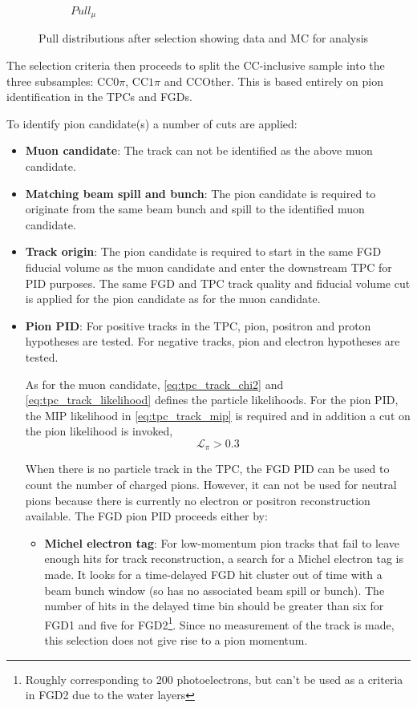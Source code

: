 \begin{figure}[h]
\begin{subfigure}[t]{0.32\textwidth}
		\caption{$Pull_\mu$}
	\end{subfigure}
	\caption{Pull distributions after selection showing data and MC for \numu analysis}
	\label{fig:numu_pulls}
\end{figure}

The selection criteria then proceeds to split the CC-inclusive sample into the three subsamples: CC$0\pi$, CC$1\pi$ and CCOther. This is based entirely on pion identification in the TPCs and FGDs.

To identify pion candidate(s) a number of cuts are applied:
\begin{itemize}
	\item \textbf{Muon candidate}: The track can not be identified as the above muon candidate.
	
	\item \textbf{Matching beam spill and bunch}: The pion candidate is required to originate from the same beam bunch and spill to the identified muon candidate.
	
	\item \textbf{Track origin}: The pion candidate is required to start in the same FGD fiducial volume as the muon candidate and enter the downstream TPC for PID purposes. The same FGD and TPC track quality and fiducial volume cut is applied for the pion candidate as for the muon candidate.
	
	\item \textbf{Pion PID}: For positive tracks in the TPC, pion, positron and proton hypotheses are tested. For negative tracks, pion and electron hypotheses are tested. 
	
	As for the muon candidate, \autoref{eq:tpc_track_chi2} and \autoref{eq:tpc_track_likelihood} defines the particle likelihoods. For the pion PID, the MIP likelihood in \autoref{eq:tpc_track_mip} is required and in addition a cut on the pion likelihood is invoked,
	\begin{equation}
	\label{tpc_track_pi}
		\mathcal{L}_\pi > 0.3
	\end{equation}
	
	When there is no particle track in the TPC, the FGD PID can be used to count the number of charged pions. However, it can not be used for neutral pions because there is currently no electron or positron reconstruction available. The FGD pion PID proceeds either by:
	\begin{itemize}
		\item \textbf{Michel electron tag}: For low-momentum pion tracks that fail to leave enough hits for track reconstruction, a search for a Michel electron tag is made. It looks for a time-delayed FGD hit cluster out of time with a beam bunch window (so has no associated beam spill or bunch). The number of hits in the delayed time bin should be greater than six for FGD1 and five for FGD2\footnote{Roughly corresponding to 200 photoelectrons, but can't be used as a criteria in FGD2 due to the water layers}. Since no measurement of the track is made, this selection does not give rise to a pion momentum.
		

\end{itemize}
\end{itemize}
